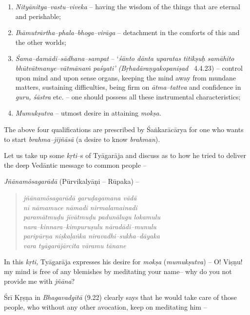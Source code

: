 \begin{enumerate}
\item \textit{Nityānitya–vastu–viveka} – having the wisdom of the things that are eternal and perishable;
 
\item \textit{Ihāmutrārtha–phala–bhoga–virāga} – detachment in the comforts of this and the other worlds;
 
\item \textit{Śama–damādi–sādhana–sampat} – ‘\textit{śānto dānta uparatas titikṣuḥ samāhito bhūtvātmanye–vātmānaṁ paśyati’ (Bṛhadāraṇyakopaniṣad}  4.4.23) – control upon mind and upon sense organs, keeping the mind away from mundane matters, sustaining difficulties, being firm on \textit{ātma–tattva} and confidence in \textit{guru, śāstra} etc. – one should possess all these instrumental characteristics;
 
\item \textit{Mumukṣutva} – utmost desire in attaining \textit{mokṣa.}
 
\end{enumerate}

The above four qualifications are prescribed by Śaṅkarācārya for one who wants to start \textit{brahma–jijñāsā} (a desire to know \textit{brahman}).

Let us take up some \textit{kṛti}–s of Tyāgarāja and discuss as to how he tried to deliver the deep Vedāntic message to common people –

\textit{Jñānamôsagarādā} (Pūrvikalyāṇi – Rūpaka) –

\begin{verse}
\textit{jñānamôsagarādā garuḍagamana vādā} \\\textit{nī nāmamuce nāmadi nirmalamainadi} \\\textit{paramātmuḍu jīvātmuḍu padunālugu lokamulu}\\\textit{nara–kinnara–kimpuruṣulu nāradādi–munulu}\\\textit{paripūrṇa niṣkaḷaṅka niravadhi–sukha–dāyaka}\\\textit{vara tyāgarājārcita vāramu tānane}
\end{verse}

In this \textit{kṛti,} Tyāgarāja expresses his desire for \textit{mokṣa} (\textit{mumukṣutva}) – O! Viṣṇu! my mind is free of any blemishes by meditating your name– why do you not provide me with \textit{jñāna}?

Śrī Kṛṣṇa in \textit{Bhagavadgītā} (9.22) clearly says that he would take care of those people, who without any other avocation, keep on meditating him –

